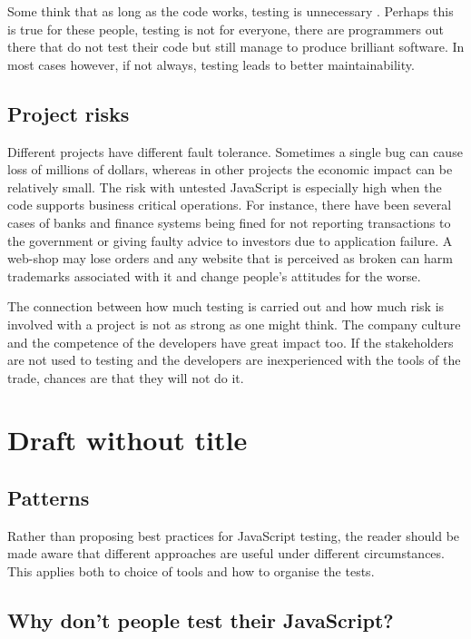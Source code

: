 \documentclass[11pt]{article}
\begin{document}
Some think that as long as the code works, testing is unnecessary \cite[question~13]{Ahnve}. Perhaps this is true for these people, testing is not for everyone, there are programmers out there that do not test their code but still manage to produce brilliant software. In most cases however, if not always, testing leads to better maintainability. \cite[question~33]{Ahnve}

\subsection{Project risks}
\label{sec:risks}

Different projects have different fault tolerance. Sometimes a single bug can cause loss of millions of dollars, whereas in other projects the economic impact can be relatively small. The risk with untested JavaScript is especially high when the code supports business critical operations. For instance, there have been several cases of banks and finance systems being fined for not reporting transactions to the government \cite{Bug1} or giving faulty advice to investors \cite{Bug2} due to application failure. A web-shop may lose orders and any website that is perceived as broken can harm trademarks associated with it and change people's attitudes for the worse.

The connection between how much testing is carried out and how much risk is involved with a project is not as strong as one might think. The company culture and the competence of the developers have great impact too. If the stakeholders are not used to testing and the developers are inexperienced with the tools of the trade, chances are that they will not do it. \cite[question~14]{Ahnve}


\section{Draft without title}

\subsection{Patterns}

Rather than proposing best practices for JavaScript testing, the reader should be made aware that different approaches are useful under different circumstances. This applies both to choice of tools and how to organise the tests.

\subsection{Why don't people test their JavaScript?}
\end{document}
